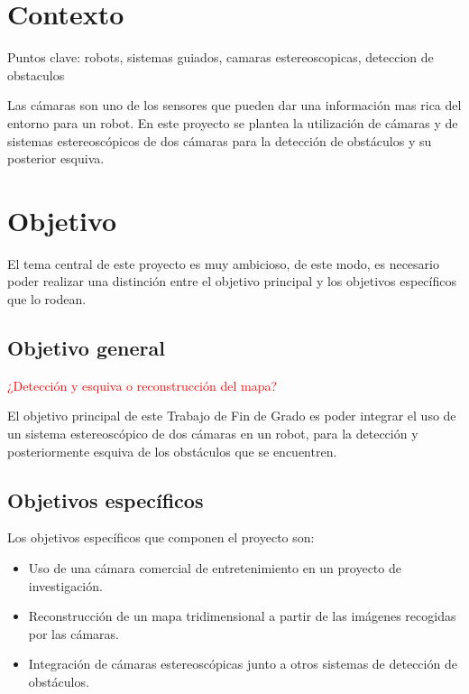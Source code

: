 \section{Contexto}
\label{1:sec:1}

Puntos clave: robots, sistemas guiados, camaras estereoscopicas, deteccion de
obstaculos

Las cámaras son uno de los sensores que pueden dar una información mas
rica del entorno para un robot. En este proyecto se plantea la utilización de
cámaras y de sistemas estereoscópicos de dos cámaras para la detección de
obstáculos y su posterior esquiva.

\section{Objetivo}
\label{1:sec:2}

El tema central de este proyecto es muy ambicioso, de este modo, es necesario
poder realizar una distinción entre el objetivo principal y los objetivos
específicos que lo rodean.

\subsection{Objetivo general}

\textcolor{red}{¿Detección y esquiva o reconstrucción del mapa?}

El objetivo principal de este Trabajo de Fin de Grado es poder integrar el uso
de un sistema estereoscópico de dos cámaras en un robot, para la detección y
posteriormente esquiva de los obstáculos que se encuentren.

\subsection{Objetivos específicos}

Los objetivos específicos que componen el proyecto son:
\begin{itemize}
\item Uso de una cámara comercial de entretenimiento en un proyecto de
investigación.
\item Reconstrucción de un mapa tridimensional a partir de las imágenes
recogidas por las cámaras.
\item Integración de cámaras estereoscópicas junto a otros sistemas de detección
de obstáculos.
\end{itemize}

